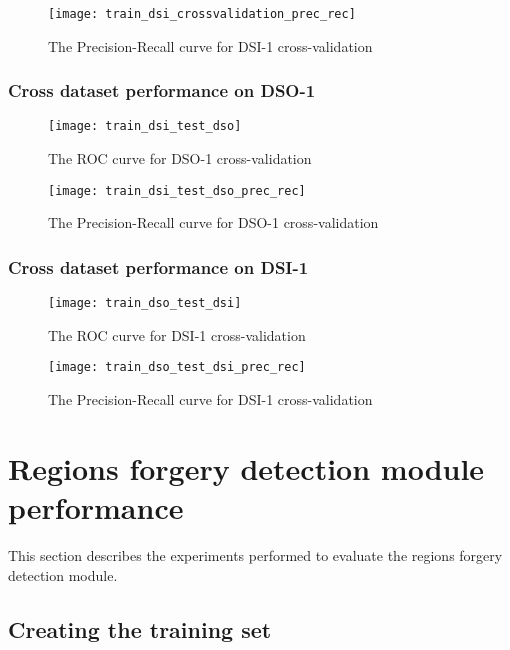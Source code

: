 \begin{figure}[h!]
  \centering
    \texttt{[image: train\_dsi\_crossvalidation\_prec\_rec]}
    \caption{The Precision-Recall curve for DSI-1 cross-validation}
    \label{fig:train_dsi_crossvalidation_prec_rec}
\end{figure}

\subsubsection{Cross dataset performance on DSO-1}

\begin{figure}[h!]
  \centering
    \texttt{[image: train\_dsi\_test\_dso]}
    \caption{The ROC curve  for DSO-1 cross-validation}
    \label{fig:train_dsi_test_dso}
\end{figure}

\begin{figure}[h!]
  \centering
    \texttt{[image: train\_dsi\_test\_dso\_prec\_rec]}
    \caption{The Precision-Recall curve for DSO-1 cross-validation}
    \label{fig:train_dsi_test_dso}
\end{figure}

\subsubsection{Cross dataset performance on DSI-1}


\begin{figure}[h!]
  \centering
    \texttt{[image: train\_dso\_test\_dsi]}
    \caption{The ROC curve  for DSI-1 cross-validation}
    \label{fig:train_dso_test_dsi}
\end{figure}

\begin{figure}[h!]
  \centering
    \texttt{[image: train\_dso\_test\_dsi\_prec\_rec]}
    \caption{The Precision-Recall curve for DSI-1 cross-validation}
    \label{fig:train_dso_test_dsi_prec_rec}
\end{figure}

\section{Regions forgery detection module performance}

This section describes the experiments performed to evaluate the regions forgery detection module.

\subsection{Creating the training set}

